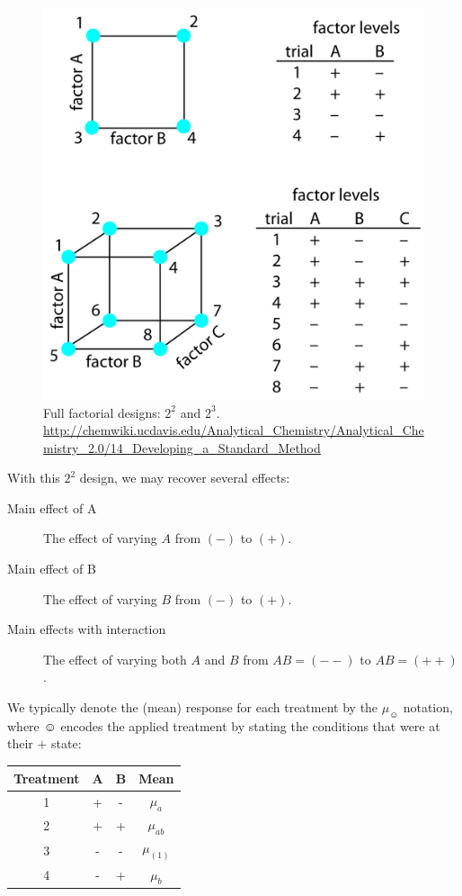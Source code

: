 \begin{figure}[H]
\centering
\includegraphics[width=0.7\linewidth, height=0.3\textheight]{art/full_factorial}
\caption[Full Factorial Design]{Full factorial designs: $2^2$ and $2^3$. \newline \url{http://chemwiki.ucdavis.edu/Analytical_Chemistry/Analytical_Chemistry_2.0/14_Developing_a_Standard_Method}}
\label{fig:full_factorial}
\end{figure}
With this $2^2$ design, we may recover several effects:
\begin{description}
\item [Main effect of A] The effect of varying $A$ from $(-)$ to $(+)$.
\item [Main effect of B] The effect of varying $B$ from $(-)$ to $(+)$.
\item [Main effects with interaction] The effect of varying both $A$ and $B$ from $AB=(--)$ to $AB=(++)$.
\end{description}



We typically denote the (mean) response for each treatment by the $\mu_{\smiley}$ notation, where $\smiley$ encodes the applied treatment by stating the conditions that were at their $+$ state:
\begin{table}[H]
\centering
\begin{tabular}{|c|c|c|c|}
\hline Treatment & A & B & Mean \\ 
\hline 1 & + & - & $\mu_a$ \\ 
\hline 2 & + & + & $\mu_{ab}$ \\ 
\hline 3 & - & - & $\mu_{(1)}$ \\ 
\hline 4 & - & + & $\mu_b$ \\ 
\hline 
\end{tabular} 
\end{table}

